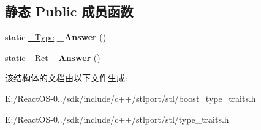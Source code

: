 \subsection*{静态 Public 成员函数}
\begin{DoxyCompactItemize}
\item 
\mbox{\label{struct___trivial_u_copy_a20737bce90f2f94ff2c9a3c90de13634}} 
static \hyperlink{struct____false__type}{\+\_\+\+Type} {\bfseries \+\_\+\+Answer} ()
\item 
\mbox{\label{struct___trivial_u_copy_a4c88da4f6b6c67a7e9704794ae36dec1}} 
static \hyperlink{struct____true__type}{\+\_\+\+Ret} {\bfseries \+\_\+\+Answer} ()
\end{DoxyCompactItemize}


该结构体的文档由以下文件生成\+:\begin{DoxyCompactItemize}
\item 
E\+:/\+React\+O\+S-\/0../sdk/include/c++/stlport/stl/boost\+\_\+type\+\_\+traits.\+h\item 
E\+:/\+React\+O\+S-\/0../sdk/include/c++/stlport/stl/type\+\_\+traits.\+h\end{DoxyCompactItemize}
